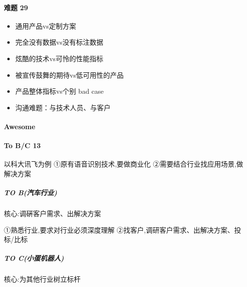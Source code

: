 \documentclass[letterpaper,11pt,english]{sphinxmanual}
\begin{document}
\paragraph{难题 29\sphinxfootnotemark[100]}
\label{\detokenize{chapter_introduction/AI_PM:id27}}%
\begin{footnotetext}[100]\sphinxAtStartFootnote
{}
%
\end{footnotetext}\ignorespaces \begin{itemize}
\item {} 
通用产品vs定制方案

\item {} 
完全没有数据vs没有标注数据

\item {} 
炫酷的技术vs可怜的性能指标

\item {} 
被宣传鼓舞的期待vs低可用性的产品

\item {} 
产品整体指标vs个别 bad case

\item {} 
沟通难题：与技术人员、与客户

\end{itemize}


\paragraph{Awesome}
\label{\detokenize{chapter_introduction/AI_PM:awesome}}


\paragraph{To B/C 13\sphinxfootnotemark[101]}
\label{\detokenize{chapter_introduction/AI_PM:to-b-c-13}}%
\begin{footnotetext}[101]\sphinxAtStartFootnote
{}
%
\end{footnotetext}\ignorespaces 
以科大讯飞为例 ①原有语音识别技术,要做商业化
②需要结合行业找应用场景,做解决方案


\subparagraph{TO B(汽车行业)}
\label{\detokenize{chapter_introduction/AI_PM:to-b}}
核心:调硏客户需求、出解决方案

①熟悉行业,要求对行业必须深度理解
②找客户,调研客户需求、出解决方案、投标/比标


\subparagraph{TO C(小蛋机器人)}
\label{\detokenize{chapter_introduction/AI_PM:to-c}}
核心:为其他行业树立标杆
\end{document}
